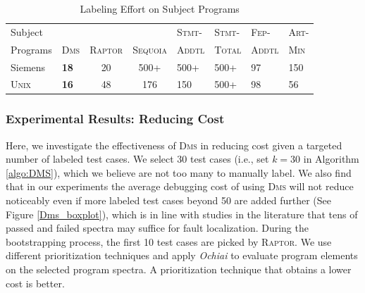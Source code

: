 \begin{table}[tbp]
	\centering
	\caption{Labeling Effort on Subject Programs}
{
	\scriptsize
		\renewcommand{\arraystretch}{1.5}
        \begin{tabular}{|m{32pt}|m{13pt}|c|c|m{21pt}|m{21pt}|m{21pt}|m{17pt}|}
		   \hline
		     Subject &             &                &                  & \textsc{Stmt-} & \textsc{Stmt-} & \textsc{Fep-}  & \textsc{Art-} \\
		   Programs & \textsc{Dms} & \textsc{Raptor}  & \textsc{Sequoia} & \textsc{Addtl} & \textsc{Total} & \textsc{Addtl} & \textsc{Min} \\
		   \hline\hline
		   Siemens &   {\bf 18} &         20 &       500\tiny{+} &       500\tiny{+} &       500\tiny{+} &         97 &        150 \\
		   \hline
			\textsc{Unix} &   {\bf 16} &         48 &    176 &        150 &       500\tiny{+} &         98 &         56 \\
		   \hline
		\end{tabular}
}
	\label{tab:label_effort}
\end{table}


\subsubsection{Experimental Results: Reducing Cost}\label{sec.exp.resultsB}

Here, we investigate the effectiveness of \textsc{Dms} in reducing cost given a targeted number of labeled test cases. We select 30 test cases (i.e., set $k=30$ in Algorithm \ref{algo:DMS}), which we believe are not too many to manually label. We also find that in our experiments the average debugging cost of using \textsc{Dms} will not reduce noticeably even if more labeled test cases beyond 50 are added further (See Figure \ref{Dms_boxplot}), which is in line with studies in the literature \cite[e.g.][]{Abreu:2009.jss,Libl+05} that tens of passed and failed spectra may suffice for fault localization. During the bootstrapping process, the first 10 test cases are picked by \textsc{Raptor}. We use different prioritization techniques and apply {\em Ochiai} to evaluate program elements on the selected program spectra. A prioritization technique that obtains a lower cost is better.

